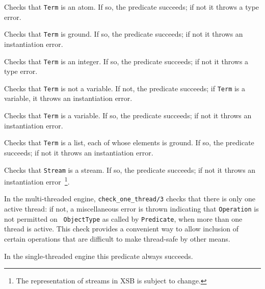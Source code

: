 \begin{description}
%
Checks that {\tt Term} is an atom.  If so, the predicate succeeds;
if not it throws a type error.

%
Checks that {\tt Term} is ground.  If so, the predicate succeeds;
if not it throws an instantiation error.

%
Checks that {\tt Term} is an integer.  If so, the predicate succeeds;
if not it throws a type error.

%
Checks that {\tt Term} is not a variable.  If not, the predicate succeeds;
if {\tt Term} is a variable,  it throws an instantiation error.

%
Checks that {\tt Term} is a variable.  If so, the predicate succeeds;
if not it throws an instantiation error.


Checks that {\tt Term} is a list, each of whose elements is ground.
If so, the predicate succeeds; if not it throws an instantiation
error.
	    
%
Checks that {\tt Stream} is a stream.  If so, the predicate succeeds;
if not it throws an instantiation error~\footnote{The representation
of streams in XSB is subject to change.}.

%
In the multi-threaded engine, {\tt check\_one\_thread/3} checks that
there is only one active thread: if not, a miscellaneous error is
thrown indicating that {\tt Operation} is not permitted on {\tt
  ObjectType} as called by {\tt Predicate}, when more than one thread
is active.  This check provides a convenient way to allow inclusion of
certain operations that are difficult to make thread-safe by other
means.

In the single-threaded engine this predicate always succeeds.

\end{description}

